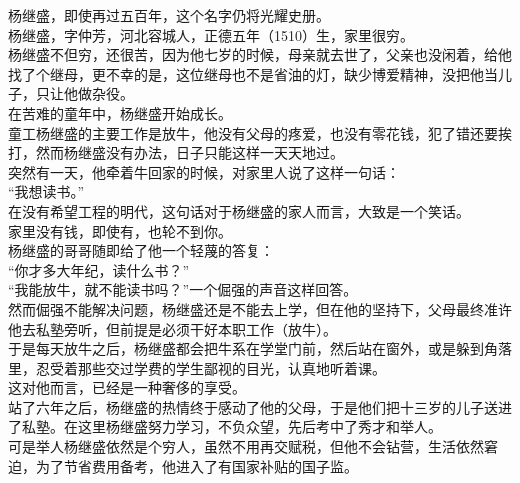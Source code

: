 \begin{multicols}{\theparacolNo}
杨继盛，即使再过五百年，这个名字仍将光耀史册。\\

杨继盛，字仲芳，河北容城人，正德五年（1510）生，家里很穷。\\

杨继盛不但穷，还很苦，因为他七岁的时候，母亲就去世了，父亲也没闲着，给他找了个继母，更不幸的是，这位继母也不是省油的灯，缺少博爱精神，没把他当儿子，只让他做杂役。\\

在苦难的童年中，杨继盛开始成长。\\

童工杨继盛的主要工作是放牛，他没有父母的疼爱，也没有零花钱，犯了错还要挨打，然而杨继盛没有办法，日子只能这样一天天地过。\\

突然有一天，他牵着牛回家的时候，对家里人说了这样一句话：\\

“我想读书。”\\

在没有希望工程的明代，这句话对于杨继盛的家人而言，大致是一个笑话。\\

家里没有钱，即使有，也轮不到你。\\

杨继盛的哥哥随即给了他一个轻蔑的答复：\\

“你才多大年纪，读什么书？”\\

“我能放牛，就不能读书吗？”一个倔强的声音这样回答。\\

然而倔强不能解决问题，杨继盛还是不能去上学，但在他的坚持下，父母最终准许他去私塾旁听，但前提是必须干好本职工作（放牛）。\\

于是每天放牛之后，杨继盛都会把牛系在学堂门前，然后站在窗外，或是躲到角落里，忍受着那些交过学费的学生鄙视的目光，认真地听着课。\\

这对他而言，已经是一种奢侈的享受。\\

站了六年之后，杨继盛的热情终于感动了他的父母，于是他们把十三岁的儿子送进了私塾。在这里杨继盛努力学习，不负众望，先后考中了秀才和举人。\\

可是举人杨继盛依然是个穷人，虽然不用再交赋税，但他不会钻营，生活依然窘迫，为了节省费用备考，他进入了有国家补贴的国子监。\\


\end{multicols}
